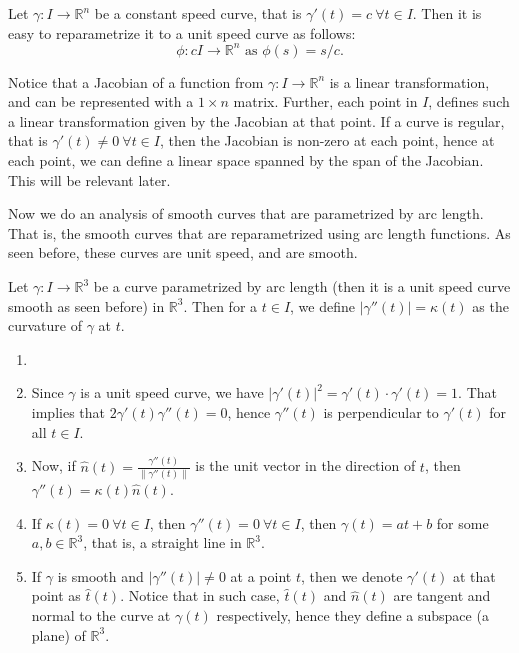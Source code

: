 \begin{eg}
    Let $\gamma:I\to\mathbb{R}^{n}$ be a constant speed curve, that is $\gamma'(t)=c~\forall t\in I$. Then it is easy to reparametrize it to a unit speed curve as follows: $$\phi:cI\to\mathbb{R}^{n}\text{ as }\phi(s)=s/c.$$
\end{eg}
\vspace{0.4cm}
\begin{note}
    Notice that a Jacobian of a function from $\gamma:I\to \mathbb{R}^{n}$ is a linear transformation, and can be represented with a $1\times n$ matrix. Further, each point in $I$, defines such a linear transformation given by the Jacobian at that point. If a curve is regular, that is $\gamma'(t)\neq0~\forall t\in I$, then the Jacobian is non-zero at each point, hence at each point, we can define a linear space spanned by the span of the Jacobian. This will be relevant later.
\end{note}
\vspace{0.4cm}
\begin{motive}
    Now we do an analysis of smooth curves that are parametrized by arc length. That is, the smooth curves that are reparametrized using arc length functions. As seen before, these curves are unit speed, and are smooth.
\end{motive}
\vspace{0.4cm}
\begin{definition}
    Let $\gamma:I\to \mathbb{R}^{3}$ be a curve parametrized by arc length (then it is a unit speed curve smooth as seen before) in $\mathbb{R}^{3}$. Then for a $t\in I$, we define $|\gamma''(t)|=\kappa(t)$ as the curvature of $\gamma$ at $t$.
\end{definition}
\vspace{0.4cm}
\begin{property}
    \begin{enumerate}[label=\roman*.]
        \item []
        \item Since $\gamma$ is a unit speed curve, we have $|\gamma'(t)|^{2}=\gamma'(t)\cdot\gamma'(t)=1$. That implies that $2\gamma'(t)\gamma''(t)=0$, hence $\gamma''(t)$ is perpendicular to $\gamma'(t)$ for all $t\in I$. 
        \item Now, if $\hat{n}(t)=\frac{\gamma''(t)}{\|\gamma''(t)\|}$ is the unit vector in the direction of $t$, then $\gamma''(t)=\kappa(t)\hat{n}(t)$.
        \item If $\kappa(t)=0~\forall t\in I$, then $\gamma''(t)=0~\forall t\in I$, then $\gamma(t)=at+b$ for some $a,b\in \mathbb{R}^{3}$, that is, a straight line in $\mathbb{R}^{3}$.
        \item If $\gamma$ is smooth and $|\gamma''(t)|\neq 0$ at a point $t$, then we denote $\gamma'(t)$ at that point as $\hat{t}(t)$. Notice that in such case, $\hat{t}(t)$ and $\hat{n}(t)$ are tangent and normal to the curve at $\gamma(t)$ respectively, hence they define a subspace (a plane) of $\mathbb{R}^{3}$.
    \end{enumerate}
\end{property}
